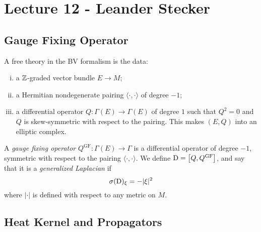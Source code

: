 \chapter{Lecture 12 - Leander Stecker}

\section{Gauge Fixing Operator}

\begin{definition}
  A free theory in the BV formalism is the data:
  \begin{enumerate}[i)]
    \item a $\mathbb{Z}$-graded vector bundle $E \to M$;
    \item a Hermitian nondegenerate pairing $\langle \cdot, \cdot \rangle$ of degree $-1$;
    \item a differential operator $Q \colon \Gamma(E) \to \Gamma(E)$ of degree $1$ such that $Q^2 = 0$ and $Q$ is skew-symmetric with respect to the pairing.
This makes $(E, Q)$ into an elliptic complex.
  \end{enumerate}
\end{definition}

\begin{definition}
  A \textit{gauge fixing operator} $Q^\text{GF} \colon \Gamma(E) \to \Gamma$ is a differential operator of degree $-1$, symmetric with respect to the pairing $\langle \cdot, \cdot \rangle$.
  We define $\mathrm{D} = \bigl[Q, Q^\text{GF}\bigr]$, and say that it is a \textit{generalized Laplacian} if
  \begin{equation*}
    \sigma(\mathrm{D})_\xi = - |\xi|^2
  \end{equation*}
  where $|\cdot|$ is defined with respect to any metric on $M$.
\end{definition}

\section{Heat Kernel and Propagators}

